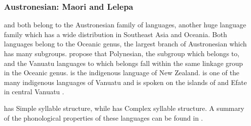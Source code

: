 \subsubsection{{Austronesian:} {Maori} {and} {Lelepa}}\label{sec:8.4.3.6}

   and  both belong to the Austronesian family of languages, another huge language family which has a wide distribution in Southeast Asia and Oceania. Both languages belong to the Oceanic genus, the largest branch of Austronesian which has many subgroups. \citet{LynchEtAl2002} propose that Polynesian, the subgroup which  belongs to, and the Vanuatu languages to which  belongs fall within the same linkage group in the Oceanic genus.  is the indigenous language of New Zealand.  is one of the many indigenous languages of Vanuatu and is spoken on the islands of  and Efate in central Vanuatu \citep{Lacrampe2014}.

   has Simple syllable structure, while  has Complex syllable structure. A summary of the phonological properties of these languages can be found in .

